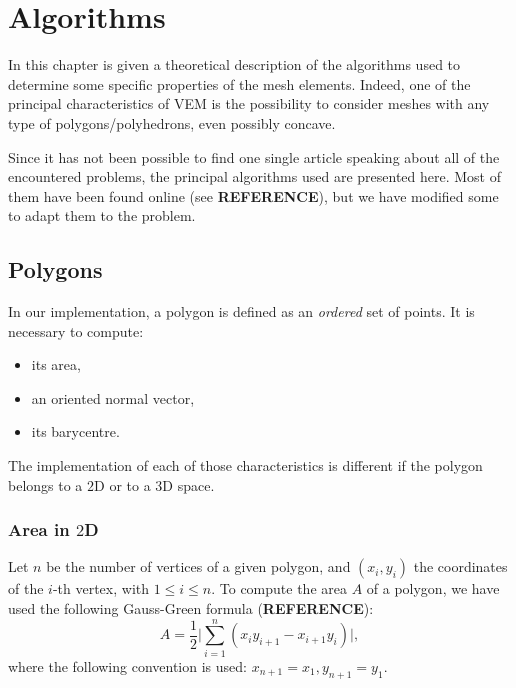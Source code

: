 \newpage
\section{Algorithms}
In this chapter is given a theoretical description of the algorithms used to determine some specific properties of the mesh elements. Indeed, one of the principal characteristics of VEM is the possibility to consider meshes with any type of polygons/polyhedrons, even possibly concave. 

Since it has not been possible to find one single article speaking about all of the encountered problems, the principal algorithms used are presented here. Most of them have been found online (see \textbf{REFERENCE}), but we have modified some to adapt them to the problem.

\subsection{Polygons}\label{polygons}
In our implementation, a polygon is defined as an \textit{ordered} set of points. It is necessary to compute:
\begin{itemize}
\item its area,
\item an oriented normal vector,
\item its barycentre.
\end{itemize}
The implementation of each of those characteristics is different if the polygon belongs to a $2$D or to a $3$D space.

\subsubsection{Area in $2$D}\label{area2d}
Let $n$ be the number of vertices of a given polygon, and $(x_i,y_i)$ the coordinates of the $i$-th vertex, with $1\leq i\leq n$. To compute the area $A$ of a polygon, we have used the following Gauss-Green formula (\textbf{REFERENCE}):
$$ A=\frac{1}{2} \bigg | \sum_{i=1}^n (x_iy_{i+1}-x_{i+1}y_i) \bigg
|,$$
where the following convention is used: $x_{n+1}=x_1,y_{n+1}=y_1$.


